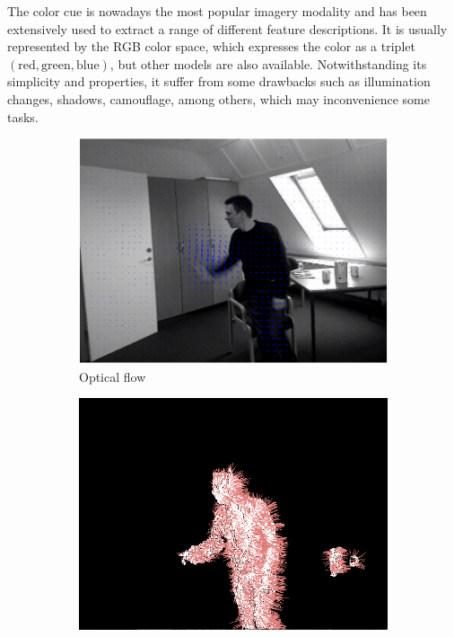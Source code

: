 \documentclass[10pt,twocolumn,letterpaper]{article}
\begin{document}
The color cue is nowadays the most popular imagery modality and has been extensively used to extract a range of different feature descriptions. It is usually represented by the RGB color space, which expresses the color as a triplet $(\text{red}, \text{green}, \text{blue})$, but other models are also available. Notwithstanding its simplicity and properties, it suffer from some drawbacks such as illumination changes, shadows, camouflage, among others, which may inconvenience some tasks.

\begin{figure}
	\center
        \begin{subfigure}[b]{0.45\textwidth}
                \includegraphics[width=\textwidth]{opticalflow_final.eps}
                \caption{Optical flow}
                \label{fig:opticalflow}
        \end{subfigure}
        \begin{subfigure}[b]{0.45\textwidth}
                \includegraphics[width=\textwidth]{normals.png}

\end{subfigure}
\end{figure}
\end{document}
